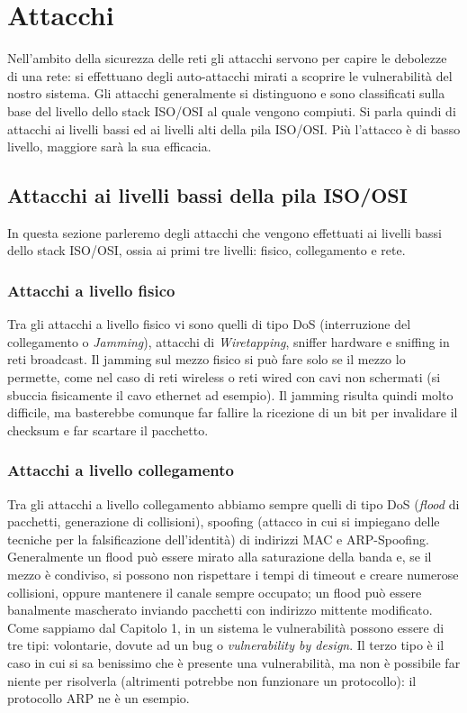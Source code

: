 \chapter{Attacchi}
Nell'ambito della sicurezza delle reti gli attacchi servono per capire le debolezze di una rete: si effettuano degli auto-attacchi mirati a scoprire le vulnerabilità del nostro sistema. Gli attacchi generalmente si distinguono e sono classificati sulla base del livello dello stack ISO/OSI al quale vengono compiuti. Si parla quindi di attacchi ai livelli bassi ed ai livelli alti della pila ISO/OSI. Più l'attacco è di basso livello, maggiore sarà la sua efficacia.

\section{Attacchi ai livelli bassi della pila ISO/OSI}
In questa sezione parleremo degli attacchi che vengono effettuati ai livelli bassi dello stack ISO/OSI, ossia ai primi tre livelli: fisico, collegamento e rete.

\subsection{Attacchi a livello fisico}
Tra gli attacchi a livello fisico vi sono quelli di tipo DoS (interruzione del collegamento o \textit{Jamming}), attacchi di \textit{Wiretapping}, sniffer hardware e sniffing in reti broadcast. Il jamming sul mezzo fisico si può fare solo se il mezzo lo permette, come nel caso di reti wireless o reti wired con cavi non schermati (si sbuccia fisicamente il cavo ethernet ad esempio). Il jamming risulta quindi molto difficile, ma basterebbe comunque far fallire la ricezione di un bit per invalidare il checksum e far scartare il pacchetto.

\subsection{Attacchi a livello collegamento}
Tra gli attacchi a livello collegamento abbiamo sempre quelli di tipo DoS (\textit{flood} di pacchetti, generazione di collisioni), spoofing (attacco in cui si impiegano delle tecniche per la falsificazione dell'identità) di indirizzi MAC e ARP-Spoofing. Generalmente un flood può essere mirato alla saturazione della banda e, se il mezzo è condiviso, si possono non rispettare i tempi di timeout e creare numerose collisioni, oppure mantenere il canale sempre occupato; un flood può essere banalmente mascherato inviando pacchetti con indirizzo mittente modificato.\\
Come sappiamo dal Capitolo 1, in un sistema le vulnerabilità possono essere di tre tipi: volontarie, dovute ad un bug o \textit{vulnerability by design}. Il terzo tipo è il caso in cui si sa benissimo che è presente una vulnerabilità, ma non è possibile far niente per risolverla (altrimenti potrebbe non funzionare un protocollo): il protocollo ARP ne è un esempio.\\

